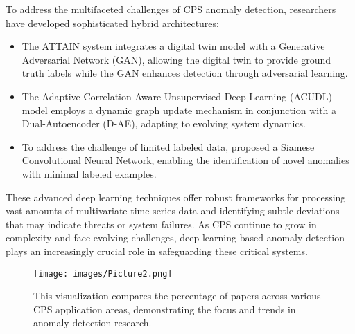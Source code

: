 To address the multifaceted challenges of CPS anomaly detection, researchers have developed sophisticated hybrid architectures:

\begin{itemize}
    \item The ATTAIN system \cite{68} integrates a digital twin model with a Generative Adversarial Network (GAN), allowing the digital twin to provide ground truth labels while the GAN enhances detection through adversarial learning.
    
    \item The Adaptive-Correlation-Aware Unsupervised Deep Learning (ACUDL) model \cite{91} employs a dynamic graph update mechanism in conjunction with a Dual-Autoencoder (D-AE), adapting to evolving system dynamics.
    
    \item To address the challenge of limited labeled data, \cite{58} proposed a Siamese Convolutional Neural Network, enabling the identification of novel anomalies with minimal labeled examples.
\end{itemize}

These advanced deep learning techniques offer robust frameworks for processing vast amounts of multivariate time series data and identifying subtle deviations that may indicate threats or system failures. As CPS continue to grow in complexity and face evolving challenges, deep learning-based anomaly detection plays an increasingly crucial role in safeguarding these critical systems.



\begin{figure}[h]
    \centering
    \texttt{[image: images/Picture2.png]}
    \caption{This visualization compares the percentage of papers across various CPS application areas, demonstrating the focus and trends in anomaly detection research.}
    \label{fig:application-of-cps}
\end{figure}


